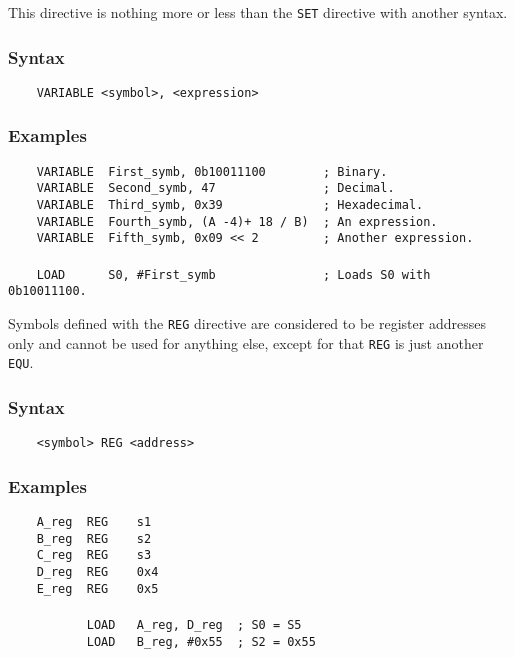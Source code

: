     This directive is nothing more or less than the \texttt{SET} directive with another syntax.

    \subsubsection{Syntax}
        \verb'    VARIABLE <symbol>, <expression>'

    \subsubsection{Examples}
        \verb'    VARIABLE  First_symb, 0b10011100        ; Binary.'\\
        \verb'    VARIABLE  Second_symb, 47               ; Decimal.'\\
        \verb'    VARIABLE  Third_symb, 0x39              ; Hexadecimal.'\\
        \verb'    VARIABLE  Fourth_symb, (A -4)+ 18 / B)  ; An expression.'\\
        \verb'    VARIABLE  Fifth_symb, 0x09 << 2         ; Another expression.'\\
        \verb''\\
        \verb'    LOAD      S0, #First_symb               ; Loads S0 with 0b10011100.'

    Symbols defined with the \texttt{REG} directive are considered to be register addresses only and cannot be used for anything else, except for that \texttt{REG} is just another \texttt{EQU}.

    \subsubsection{Syntax}
        \verb'    <symbol> REG <address>'

    \subsubsection{Examples}
        \verb'    A_reg  REG    s1'\\
        \verb'    B_reg  REG    s2'\\
        \verb'    C_reg  REG    s3'\\
        \verb'    D_reg  REG    0x4'\\
        \verb'    E_reg  REG    0x5'\\
        \verb''\\
        \verb'           LOAD   A_reg, D_reg  ; S0 = S5'\\
        \verb'           LOAD   B_reg, #0x55  ; S2 = 0x55'

